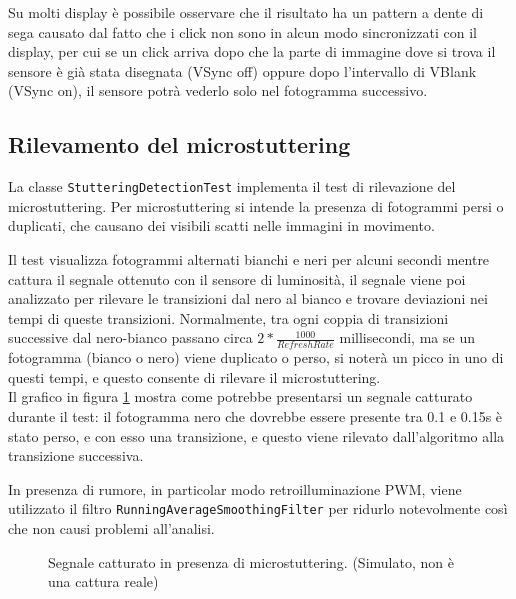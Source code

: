 Su molti display è possibile osservare che il risultato ha un pattern a dente di sega causato dal fatto che i click non sono in alcun modo sincronizzati con il display, per cui se un click arriva dopo che la parte di immagine dove si trova il sensore è già stata disegnata (VSync off) oppure dopo l'intervallo di VBlank (VSync on), il sensore potrà vederlo solo nel fotogramma successivo.

\subsection{Rilevamento del microstuttering}
La classe \texttt{StutteringDetectionTest} implementa il test di rilevazione del microstuttering. Per microstuttering si intende la presenza di fotogrammi persi o duplicati, che causano dei visibili scatti nelle immagini in movimento.

Il test visualizza fotogrammi alternati bianchi e neri per alcuni secondi mentre cattura il segnale ottenuto con il sensore di luminosità, il segnale viene poi analizzato per rilevare le transizioni dal nero al bianco e trovare deviazioni nei tempi di queste transizioni. Normalmente, tra ogni coppia di transizioni successive dal nero-bianco passano circa $2*\frac{1000}{RefreshRate}$ millisecondi, ma se un fotogramma (bianco o nero) viene duplicato o perso, si noterà un picco in uno di questi tempi, e questo consente di rilevare il microstuttering.\\
Il grafico in figura \ref{fig:stutteringDetectionTest_example} mostra come potrebbe presentarsi un segnale catturato durante il test: il fotogramma nero che dovrebbe essere presente tra 0.1 e 0.15s è stato perso, e con esso una transizione, e questo viene rilevato dall'algoritmo alla transizione successiva.

In presenza di rumore, in particolar modo retroilluminazione PWM, viene utilizzato il filtro \texttt{RunningAverageSmoothingFilter} per ridurlo notevolmente così che non causi problemi all'analisi.

\begin{figure}[H]
	\centering
	\caption{Segnale catturato in presenza di microstuttering. (Simulato, non è una cattura reale)}
	\label{fig:stutteringDetectionTest_example}
\end{figure}

